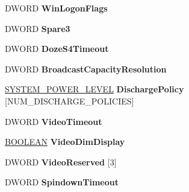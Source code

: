 \begin{DoxyCompactItemize}
D\+W\+O\+RD {\bfseries Win\+Logon\+Flags}
\item 
\mbox{\label{struct___s_y_s_t_e_m___p_o_w_e_r___p_o_l_i_c_y_ad46fcee1cb19dd0a74bb801d75578fa4}} 
D\+W\+O\+RD {\bfseries Spare3}
\item 
\mbox{\label{struct___s_y_s_t_e_m___p_o_w_e_r___p_o_l_i_c_y_a9ab34f790e35c011feb1d313cb672fd9}} 
D\+W\+O\+RD {\bfseries Doze\+S4\+Timeout}
\item 
\mbox{\label{struct___s_y_s_t_e_m___p_o_w_e_r___p_o_l_i_c_y_a2a5f45fe2aa85018a7357c3dc4cd969d}} 
D\+W\+O\+RD {\bfseries Broadcast\+Capacity\+Resolution}
\item 
\mbox{\label{struct___s_y_s_t_e_m___p_o_w_e_r___p_o_l_i_c_y_a039cad804ced7df7a82a3b0cad5547ad}} 
\hyperlink{struct___s_y_s_t_e_m___p_o_w_e_r___l_e_v_e_l}{S\+Y\+S\+T\+E\+M\+\_\+\+P\+O\+W\+E\+R\+\_\+\+L\+E\+V\+EL} {\bfseries Discharge\+Policy} \mbox{[}N\+U\+M\+\_\+\+D\+I\+S\+C\+H\+A\+R\+G\+E\+\_\+\+P\+O\+L\+I\+C\+I\+ES\mbox{]}
\item 
\mbox{\label{struct___s_y_s_t_e_m___p_o_w_e_r___p_o_l_i_c_y_a28460b2a63158feee5f91b23fdffc8c0}} 
D\+W\+O\+RD {\bfseries Video\+Timeout}
\item 
\mbox{\label{struct___s_y_s_t_e_m___p_o_w_e_r___p_o_l_i_c_y_a8401bed68b44866bd11aa9629187d708}} 
\hyperlink{_processor_bind_8h_a112e3146cb38b6ee95e64d85842e380a}{B\+O\+O\+L\+E\+AN} {\bfseries Video\+Dim\+Display}
\item 
\mbox{\label{struct___s_y_s_t_e_m___p_o_w_e_r___p_o_l_i_c_y_a5196359870c6a40b74102c7075c33af8}} 
D\+W\+O\+RD {\bfseries Video\+Reserved} \mbox{[}3\mbox{]}
\item 
\mbox{\label{struct___s_y_s_t_e_m___p_o_w_e_r___p_o_l_i_c_y_a40c979e59906299dd94b70fa0c5e0ca0}} 
D\+W\+O\+RD {\bfseries Spindown\+Timeout}
\item 

\end{DoxyCompactItemize}
